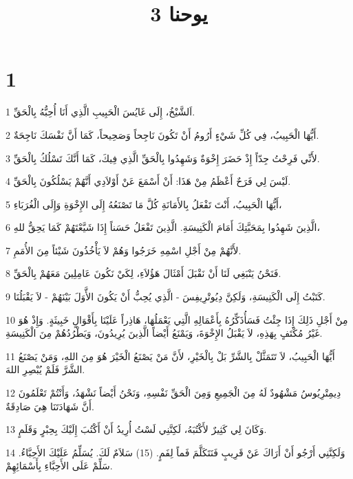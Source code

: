 

\title{3 يوحنا}


\chapter{1}

\par 1 اَلشَّيْخُ، إِلَى غَايُسَ الْحَبِيبِ الَّذِي أَنَا أُحِبُّهُ بِالْحَقِّ.
\par 2 أَيُّهَا الْحَبِيبُ، فِي كُلِّ شَيْءٍ أَرُومُ أَنْ تَكُونَ نَاجِحاً وَصَحِيحاً، كَمَا أَنَّ نَفْسَكَ نَاجِحَةٌ.
\par 3 لأَنِّي فَرِحْتُ جِدّاً إِذْ حَضَرَ إِخْوَةٌ وَشَهِدُوا بِالْحَقِّ الَّذِي فِيكَ، كَمَا أَنَّكَ تَسْلُكُ بِالْحَقِّ.
\par 4 لَيْسَ لِي فَرَحٌ أَعْظَمُ مِنْ هَذَا: أَنْ أَسْمَعَ عَنْ أَوْلاَدِي أَنَّهُمْ يَسْلُكُونَ بِالْحَقِّ.
\par 5 أَيُّهَا الْحَبِيبُ، أَنْتَ تَفْعَلُ بِالأَمَانَةِ كُلَّ مَا تَصْنَعُهُ إِلَى الإِخْوَةِ وَإِلَى الْغُرَبَاءِ،
\par 6 الَّذِينَ شَهِدُوا بِمَحَبَّتِكَ أَمَامَ الْكَنِيسَةِ. الَّذِينَ تَفْعَلُ حَسَناً إِذَا شَيَّعْتَهُمْ كَمَا يَحِقُّ للهِ،
\par 7 لأَنَّهُمْ مِنْ أَجْلِ اسْمِهِ خَرَجُوا وَهُمْ لاَ يَأْخُذُونَ شَيْئاً مِنَ الأُمَمِ.
\par 8 فَنَحْنُ يَنْبَغِي لَنَا أَنْ نَقْبَلَ أَمْثَالَ هَؤُلاَءِ، لِكَيْ نَكُونَ عَامِلِينَ مَعَهُمْ بِالْحَقِّ.
\par 9 كَتَبْتُ إِلَى الْكَنِيسَةِ، وَلَكِنَّ دِيُوتْرِيفِسَ - الَّذِي يُحِبُّ أَنْ يَكُونَ الأَّوَلَ بَيْنَهُمْ - لاَ يَقْبَلُنَا.
\par 10 مِنْ أَجْلِ ذَلِكَ إِذَا جِئْتُ فَسَأُذَكِّرُهُ بِأَعْمَالِهِ الَّتِي يَعْمَلُهَا، هَاذِراً عَلَيْنَا بِأَقْوَالٍ خَبِيثَةٍ. وَإِذْ هُوَ غَيْرُ مُكْتَفٍ بِهَذِهِ، لاَ يَقْبَلُ الإِخْوَةَ، وَيَمْنَعُ أَيْضاً الَّذِينَ يُرِيدُونَ، وَيَطْرُدُهُمْ مِنَ الْكَنِيسَةِ.
\par 11 أَيُّهَا الْحَبِيبُ، لاَ تَتَمَثَّلْ بِالشَّرِّ بَلْ بِالْخَيْرِ، لأَنَّ مَنْ يَصْنَعُ الْخَيْرَ هُوَ مِنَ اللهِ، وَمَنْ يَصْنَعُ الشَّرَّ فَلَمْ يُبْصِرِ اللهَ.
\par 12 دِيمِتْرِيُوسُ مَشْهُودٌ لَهُ مِنَ الْجَمِيعِ وَمِنَ الْحَقِّ نَفْسِهِ، وَنَحْنُ أَيْضاً نَشْهَدُ، وَأَنْتُمْ تَعْلَمُونَ أَنَّ شَهَادَتَنَا هِيَ صَادِقَةٌ.
\par 13 وَكَانَ لِي كَثِيرٌ لأَكْتُبَهُ، لَكِنَّنِي لَسْتُ أُرِيدُ أَنْ أَكْتُبَ إِلَيْكَ بِحِبْرٍ وَقَلَمٍ.
\par 14 وَلَكِنَّنِي أَرْجُو أَنْ أَرَاكَ عَنْ قَرِيبٍ فَنَتَكَلَّمَ فَماً لِفَمٍ. (15) سَلاَمٌ لَكَ. يُسَلِّمُ عَلَيْكَ الأَحِبَّاءُ. سَلِّمْ عَلَى الأَحِبَّاءِ بِأَسْمَائِهِمْ.

